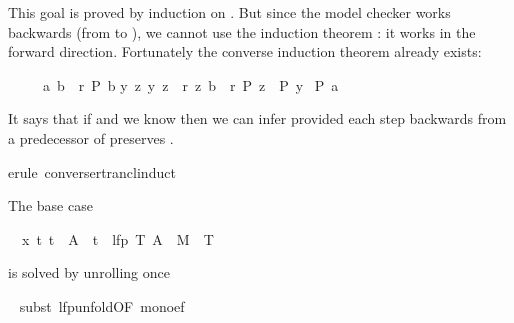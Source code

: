 \begin{isabellebody}
\begin{isamarkuptxt}
\begin{isabelle}
\end{isabelle}
This goal is proved by induction on . But since the model
checker works backwards (from  to ), we cannot use the
induction theorem : it works in the
forward direction. Fortunately the converse induction theorem
 already exists:
\begin{isabelle}%
\ \ \ \ \ {\isasymlbrakk}{\isacharparenleft}a{\isacharcomma}\ b{\isacharparenright}\ {\isasymin}\ r\isactrlsup {\isacharasterisk}{\isacharsemicolon}\ P\ b{\isacharsemicolon}\isanewline
\isaindent{\ \ \ \ \ \ \ \ }{\isasymAnd}y\ z{\isachardot}\ {\isasymlbrakk}{\isacharparenleft}y{\isacharcomma}\ z{\isacharparenright}\ {\isasymin}\ r{\isacharsemicolon}\ {\isacharparenleft}z{\isacharcomma}\ b{\isacharparenright}\ {\isasymin}\ r\isactrlsup {\isacharasterisk}{\isacharsemicolon}\ P\ z{\isasymrbrakk}\ {\isasymLongrightarrow}\ P\ y{\isasymrbrakk}\isanewline
\isaindent{\ \ \ \ \ }{\isasymLongrightarrow}\ P\ a%
\end{isabelle}
It says that if  and we know  then we can infer
 provided each step backwards from a predecessor  of
 preserves .%
\end{isamarkuptxt}%
\isamarkuptrue%
erule\ converse{\isacharunderscore}rtrancl{\isacharunderscore}induct{\isacharparenright}\isamarkupfalse%
%
\begin{isamarkuptxt}%
\noindent
The base case
\begin{isabelle}%
\ {}{\isachardot}\ {\isasymAnd}x\ t{\isachardot}\ t\ {\isasymin}\ A\ {\isasymLongrightarrow}\ t\ {\isasymin}\ lfp\ {\isacharparenleft}{\isasymlambda}T{\isachardot}\ A\ {\isasymunion}\ M{\isasyminverse}\ {\isacharbackquote}{\isacharbackquote}\ T{\isacharparenright}%
\end{isabelle}
is solved by unrolling  once%
\end{isamarkuptxt}%
\ \isamarkuptrue%
subst\ lfp{\isacharunderscore}unfold{\isacharbrackleft}OF\ mono{\isacharunderscore}ef{\isacharbrackright}{\isacharparenright}\isamarkupfalse%
%
\begin{isamarkuptxt}%
\begin{isabelle}%

\end{isabelle}
\end{isamarkuptxt}
\end{isabellebody}
